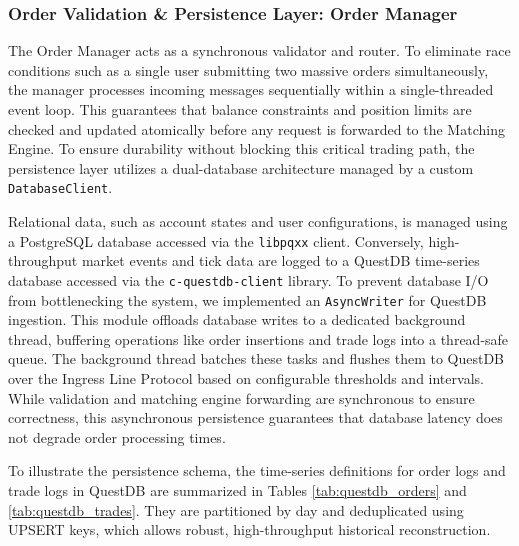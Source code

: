 \documentclass[12pt,a4paper]{article}
\begin{document}
\subsubsection{Order Validation \& Persistence Layer: Order Manager}
The Order Manager acts as a synchronous validator and router. To eliminate race conditions such as a single user submitting two massive orders simultaneously, the manager processes incoming messages sequentially within a single-threaded event loop. This guarantees that balance constraints and position limits are checked and updated atomically before any request is forwarded to the Matching Engine. To ensure durability without blocking this critical trading path, the persistence layer utilizes a dual-database architecture managed by a custom \texttt{DatabaseClient}.

Relational data, such as account states and user configurations, is managed using a PostgreSQL database accessed via the \texttt{libpqxx} client. Conversely, high-throughput market events and tick data are logged to a QuestDB time-series database accessed via the \texttt{c-questdb-client} library. To prevent database I/O from bottlenecking the system, we implemented an \texttt{AsyncWriter} for QuestDB ingestion. This module offloads database writes to a dedicated background thread, buffering operations like order insertions and trade logs into a thread-safe queue. The background thread batches these tasks and flushes them to QuestDB over the Ingress Line Protocol based on configurable thresholds and intervals. While validation and matching engine forwarding are synchronous to ensure correctness, this asynchronous persistence guarantees that database latency does not degrade order processing times.

To illustrate the persistence schema, the time-series definitions for order logs and trade logs in QuestDB are summarized in Tables \ref{tab:questdb_orders} and \ref{tab:questdb_trades}. They are partitioned by day and deduplicated using UPSERT keys, which allows robust, high-throughput historical reconstruction.
\end{document}
